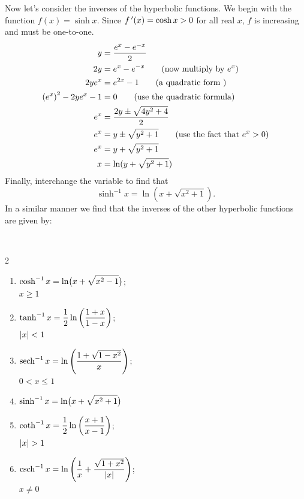 Now let's consider the inverses of the hyperbolic functions. We begin with the function $f(x)=\sinh x$. Since $f\,'(x)=\cosh x>0$ for all real $x$, $f$ is increasing and must be one-to-one.
\begin{align*}\allowdisplaybreaks
y&=\frac{e^x-e^{-x}}2\\
2y&=e^x-e^{-x} \qquad\text{(now multiply by $e^x$)}\\
2ye^x&=e^{2x}-1 \qquad\text{(a quadratic form )}\\
\left(e^x\right)^2-2ye^x-1&=0 \qquad\text{(use the quadratic formula)}\\
e^x&=\frac{2y\pm\sqrt{4y^2+4}}2\\
e^x&=y\pm\sqrt{y^2+1} \qquad\text{(use the fact that $e^x>0$)}\\
e^x&=y+\sqrt{y^2+1}\\
x&=\ln(y+\sqrt{y^2+1})\\
\end{align*}
Finally, interchange the variable to find that
\[\sinh^{-1} x=\ln(x+\sqrt{x^2+1}).\]
In a similar manner we find that the inverses of the other hyperbolic functions are given by:

{
\begin{keyidea}\label{idea:hyperbolic_log}%
\mbox{}\\[-2\baselineskip]%
%
\begin{multicols}{2}
\begin{enumerate}
\item $\displaystyle\cosh^{-1}x=\ln\bigl(x+\sqrt{x^2-1}\bigr)$;\\\null\qquad $x\geq1$
\item $\displaystyle\tanh^{-1}x=\frac12\ln\left(\frac{1+x}{1-x}\right)$;\\\null\qquad$\left\lvert x \right\rvert<1$
\item $\displaystyle\operatorname{sech}^{-1}x=\ln\left(\frac{1+\sqrt{1-x^2}}x\right)$;\\\null\qquad$0<x\leq1$
\item $\displaystyle\sinh^{-1}x=\ln\bigl(x+\sqrt{x^2+1}\bigr)$\\\mbox{}
\item $\displaystyle\coth^{-1}x=\frac12\ln\left(\frac{x+1}{x-1}\right)$;\\\null\qquad$\left\lvert x \right\rvert>1$
\item $\displaystyle\operatorname{csch}^{-1}x=\ln\left(\frac1x+\frac{\sqrt{1+x^2}}{\left\lvert x \right\rvert}\right)$;\\\null\qquad $x\neq0$
\end{enumerate}
\end{multicols}
\end{keyidea}
}

